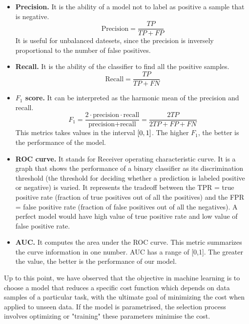 \begin{itemize}
    \item \textbf{Precision.} It is the ability of a model not to label as positive a sample that is negative. 
    \begin{equation}
        \text{Precision} = \frac{TP}{TP + FP}
    \end{equation}
    It is useful for unbalanced datesets, since the precision is inversely proportional to the number of false positives.
    
    \item \textbf{Recall.} It is the ability of the classifier to find all the positive samples.
    \begin{equation}
        \text{Recall} = \frac{TP}{TP + FN}
    \end{equation}
    
    \item \textbf{$F_1$ score.} It can be interpreted as the harmonic mean of the precision and recall. 
    \begin{equation}
        F_1 = \frac{2 \cdot \text{precision} \cdot \text{recall}}{\text{precision} + \text{recall}} = \frac{2 TP}{2 TP + FP + FN}
    \end{equation}
    This metrics takes values in the interval $\interval{0}{1}$. The higher $F_1$, the better is the performance of the model.
    
    
    \item \textbf{ROC curve.} It stands for Receiver operating characteristic curve. It is a graph that shows the performance of a binary classifier as its discrimination threshold (the threshold for deciding whether a prediction is labeled positive or negative) is varied. It represents the tradeoff between the TPR = true positive rate (fraction of true positives out of all the positives) and the FPR = false positive rate (fraction of false positives out of all the negatives). A perfect model would have high value of true positive rate and low value of false positive rate.

    \item \textbf{AUC.} It computes the area under the ROC curve. This metric summarizes the curve information in one number. AUC has a range of [0,1]. The greater the value, the better is the performance of our model.
\end{itemize}


Up to this point, we have observed that the objective in machine learning is to choose a model that reduces a specific cost function which depends on data samples of a particular task, with the ultimate goal of minimizing the cost when applied to unseen data. If the model is parametrised, the selection process involves optimizing or "training" these parameters minimise the cost. 

